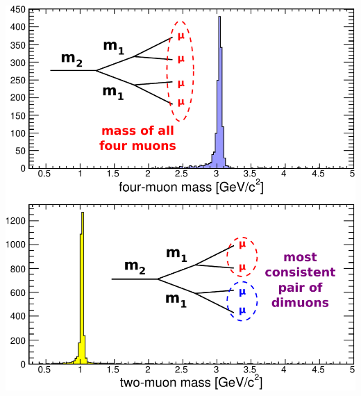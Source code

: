 \documentclass[compress]{beamer}
\begin{document}
\begin{frame}
\begin{columns}
\vspace{0.3 cm}
\includegraphics[width=\linewidth]{four-two-muon-mass.pdf}
\end{columns}

\end{frame}
\end{document}

